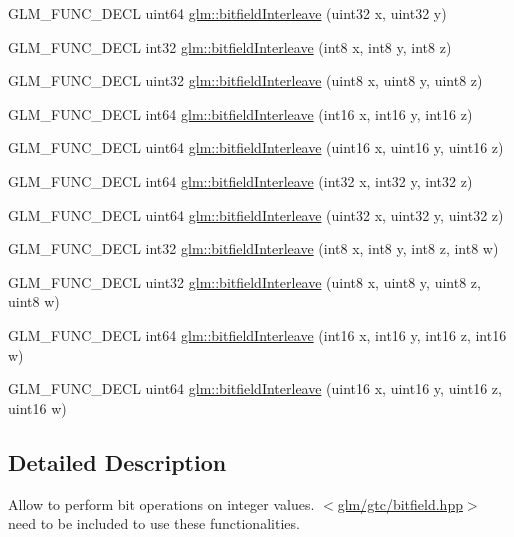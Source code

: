 \begin{DoxyCompactItemize}
\item 
G\-L\-M\-\_\-\-F\-U\-N\-C\-\_\-\-D\-E\-C\-L uint64 \hyperlink{group__gtc__bitfield_ga2f1e2b3fe699e7d897ae38b2115ddcbd}{glm\-::bitfield\-Interleave} (uint32 x, uint32 y)
\item 
G\-L\-M\-\_\-\-F\-U\-N\-C\-\_\-\-D\-E\-C\-L int32 \hyperlink{group__gtc__bitfield_ga8fdb724dccd4a07d57efc01147102137}{glm\-::bitfield\-Interleave} (int8 x, int8 y, int8 z)
\item 
G\-L\-M\-\_\-\-F\-U\-N\-C\-\_\-\-D\-E\-C\-L uint32 \hyperlink{group__gtc__bitfield_ga9fc2a0dd5dcf8b00e113f272a5feca93}{glm\-::bitfield\-Interleave} (uint8 x, uint8 y, uint8 z)
\item 
G\-L\-M\-\_\-\-F\-U\-N\-C\-\_\-\-D\-E\-C\-L int64 \hyperlink{group__gtc__bitfield_gaa901c36a842fa5d126ea650549f17b24}{glm\-::bitfield\-Interleave} (int16 x, int16 y, int16 z)
\item 
G\-L\-M\-\_\-\-F\-U\-N\-C\-\_\-\-D\-E\-C\-L uint64 \hyperlink{group__gtc__bitfield_ga3afd6d38881fe3948c53d4214d2197fd}{glm\-::bitfield\-Interleave} (uint16 x, uint16 y, uint16 z)
\item 
G\-L\-M\-\_\-\-F\-U\-N\-C\-\_\-\-D\-E\-C\-L int64 \hyperlink{group__gtc__bitfield_gad2075d96a6640121edaa98ea534102ca}{glm\-::bitfield\-Interleave} (int32 x, int32 y, int32 z)
\item 
G\-L\-M\-\_\-\-F\-U\-N\-C\-\_\-\-D\-E\-C\-L uint64 \hyperlink{group__gtc__bitfield_gab19fbc739fc0cf7247978602c36f7da8}{glm\-::bitfield\-Interleave} (uint32 x, uint32 y, uint32 z)
\item 
G\-L\-M\-\_\-\-F\-U\-N\-C\-\_\-\-D\-E\-C\-L int32 \hyperlink{group__gtc__bitfield_ga8a44ae22f5c953b296c42d067dccbe6d}{glm\-::bitfield\-Interleave} (int8 x, int8 y, int8 z, int8 w)
\item 
G\-L\-M\-\_\-\-F\-U\-N\-C\-\_\-\-D\-E\-C\-L uint32 \hyperlink{group__gtc__bitfield_ga14bb274d54a3c26f4919dd7ed0dd0c36}{glm\-::bitfield\-Interleave} (uint8 x, uint8 y, uint8 z, uint8 w)
\item 
G\-L\-M\-\_\-\-F\-U\-N\-C\-\_\-\-D\-E\-C\-L int64 \hyperlink{group__gtc__bitfield_ga180a63161e1319fbd5a53c84d0429c7a}{glm\-::bitfield\-Interleave} (int16 x, int16 y, int16 z, int16 w)
\item 
G\-L\-M\-\_\-\-F\-U\-N\-C\-\_\-\-D\-E\-C\-L uint64 \hyperlink{group__gtc__bitfield_gafca8768671a14c8016facccb66a89f26}{glm\-::bitfield\-Interleave} (uint16 x, uint16 y, uint16 z, uint16 w)
\end{DoxyCompactItemize}


\subsection{Detailed Description}
Allow to perform bit operations on integer values. $<$\hyperlink{bitfield_8hpp}{glm/gtc/bitfield.\-hpp}$>$ need to be included to use these functionalities. 

